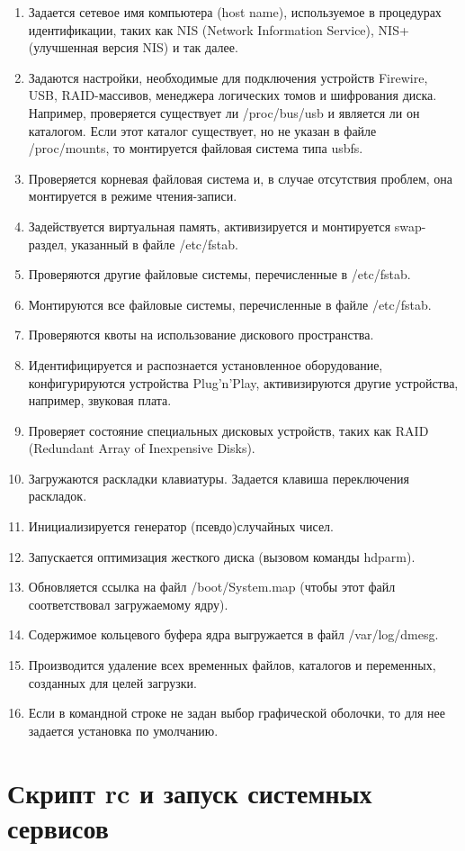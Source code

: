 \begin{enumerate}
\item Задается сетевое имя компьютера (host name), используемое в процедурах идентификации, таких как NIS (Network Information Service), NIS+ (улучшенная версия NIS) и так далее.
\item Задаются настройки, необходимые для подключения устройств Firewire, USB, RAID-массивов, менеджера логических томов и шифрования диска. Например, проверяется существует ли /proc/bus/usb и является ли он каталогом. Если этот каталог существует, но не указан в файле /proc/mounts, то монтируется файловая система типа usbfs.
\item Проверяется корневая файловая система и, в случае отсутствия проблем, она монтируется в режиме чтения-записи.
\item Задействуется виртуальная память, активизируется и монтируется swap-раздел, указанный в файле /etc/fstab.
\item Проверяются другие файловые системы, перечисленные в /etc/fstab.
\item Монтируются все файловые системы, перечисленные в файле /etc/fstab.
\item Проверяются квоты на использование дискового пространства.
\item Идентифицируется и распознается установленное оборудование, конфигурируются устройства Plug'n'Play, активизируются другие устройства, например, звуковая плата.
\item Проверяет состояние специальных дисковых устройств, таких как RAID (Redundant Array of Inexpensive Disks).
\item Загружаются раскладки клавиатуры. Задается клавиша переключения раскладок.
\item Инициализируется генератор (псевдо)случайных чисел.
\item Запускается оптимизация жесткого диска (вызовом команды hdparm).
\item Обновляется ссылка на файл /boot/System.map (чтобы этот файл соответствовал загружаемому ядру).
\item Содержимое кольцевого буфера ядра выгружается в файл /var/log/dmesg.
\item Производится удаление всех временных файлов, каталогов и переменных, созданных для целей загрузки.
\item Если в командной строке не задан выбор графической оболочки, то для нее задается установка по умолчанию.
\end{enumerate}

\newpage
\section{Скрипт rc и запуск системных сервисов}

